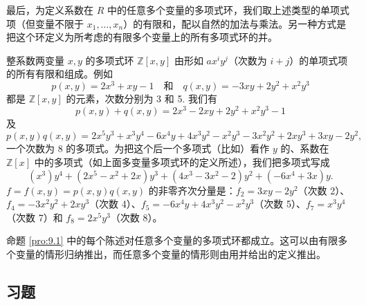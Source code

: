 最后，为定义系数在 \(R\) 中的任意多个变量的多项式环，我们取上述类型的单项式项（但变量不限于 \(x_1, \ldots, x_n\)）的有限和，配以自然的加法与乘法。另一种方式是把这个环定义为所考虑的有限多个变量上的所有多项式环的并。

\begin{example}
整系数两变量 \(x, y\) 的多项式环 \(\mathbb{Z}[x, y]\) 由形如 \(ax^iy^j\)（次数为 \(i+j\)）的单项式项的所有有限和组成。例如
\[
p(x, y) = 2x^3 + xy - 1 \quad \text{和} \quad q(x, y) = -3xy + 2y^2 + x^2y^3
\]
都是 \(\mathbb{Z}[x, y]\) 的元素，次数分别为 3 和 5. 我们有
\[
p(x, y) + q(x, y) = 2x^3 - 2xy + 2y^2 + x^2y^3 - 1
\]
及
\[
p(x, y)q(x, y) = 2x^5y^3 + x^3y^4 - 6x^4y + 4x^3y^2 - x^2y^3 - 3x^2y^2 + 2xy^3 + 3xy - 2y^2,
\]
一个次数为 8 的多项式。为把这个后一个多项式（比如）看作 \(y\) 的、系数在 \(\mathbb{Z}[x]\) 中的多项式（如上面多变量多项式环的定义所述），我们把多项式写成
\[
(x^3)y^4 + (2x^5 - x^2 + 2x)y^3 + (4x^3 - 3x^2 - 2)y^2 + (-6x^4 + 3x)y.
\]
\(f = f(x, y) = p(x, y)q(x, y)\) 的非零齐次分量是：\(f_2 = 3xy - 2y^2\)（次数 2）、\(f_4 = -3x^2y^2 + 2xy^3\)（次数 4）、\(f_5 = -6x^4y + 4x^3y^2 - x^2y^3\)（次数 5）、\(f_7 = x^3y^4\)（次数 7）和 \(f_8 = 2x^5y^3\)（次数 8）。
\end{example}

命题 \ref{pro:9.1} 中的每个陈述对任意多个变量的多项式环都成立。这可以由有限多个变量的情形归纳推出，而任意多个变量的情形则由用并给出的定义推出。

\subsection*{习题}

